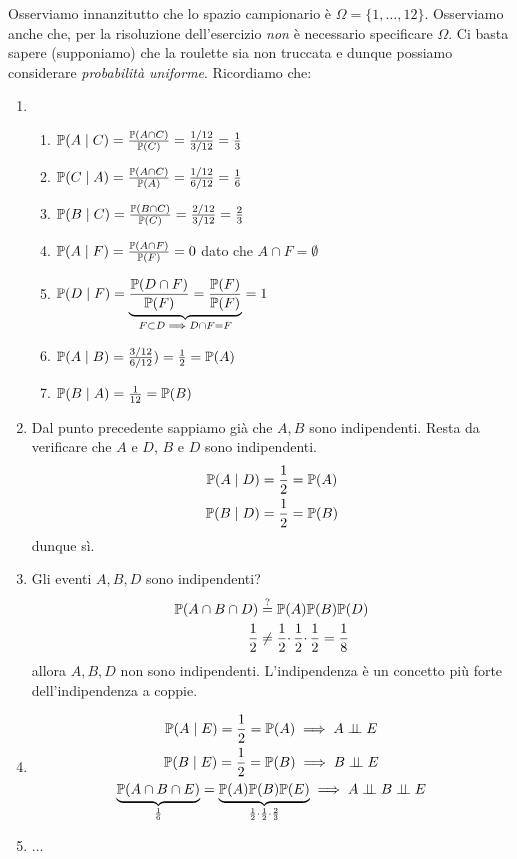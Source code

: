Osserviamo innanzitutto che lo spazio campionario è $\Omega =\{1,\dots,12\}$. Osserviamo anche che, per la risoluzione dell'esercizio \textit{non} è necessario specificare $\Omega $. Ci basta sapere (supponiamo) che la roulette sia non truccata e dunque possiamo considerare \textit{probabilità uniforme}. Ricordiamo che:
\begin{enumerate}
	\item 
	\begin{enumerate}
		\item $\mathbb{P}(A\mid C) =\frac{\mathbb{P}(A\cap C)}{\mathbb{P}(C)} =\frac{1/12}{3/12} =\frac{1}{3}$
		\item $\mathbb{P}(C\mid A) =\frac{\mathbb{P}(A\cap C)}{\mathbb{P}(A)} =\frac{1/12}{6/12} =\frac{1}{6}$
		\item $\mathbb{P}(B\mid C) =\frac{\mathbb{P}(B\cap C)}{\mathbb{P}(C)} =\frac{2/12}{3/12} =\frac{2}{3}$
		\item $\mathbb{P}(A\mid F) =\frac{\mathbb{P}(A\cap F)}{\mathbb{P}(F)} =0$ dato che $A\cap F=\emptyset $
		\item $\mathbb{P}(D\mid F) =\underbrace{\frac{\mathbb{P}(D\cap F)}{\mathbb{P}(F)} =\frac{\mathbb{P}(F)}{\mathbb{P}(F)}}_{F\subset D\implies D\cap F=F} =1$
		\item $\mathbb{P}(A\mid B) =\frac{3/12}{6/12}) =\frac{1}{2} =\mathbb{P}(A)$
		\item $\mathbb{P}(B\mid A) =\frac{1}{12} =\mathbb{P}(B)$
	\end{enumerate}
	\item Dal punto precedente sappiamo già che $A,B$ sono indipendenti. Resta da verificare che $A$ e $D$, $B$ e $D$ sono indipendenti.
	\begin{gather*}
		\mathbb{P}(A\mid D) =\frac{1}{2} =\mathbb{P}(A)\\
		\mathbb{P}(B\mid D) =\frac{1}{2} =\mathbb{P}(B)
	\end{gather*}
	dunque sì.
	\item Gli eventi $A,B,D$ sono indipendenti?
	\begin{align*}
		\mathbb{P}(A\cap B\cap D) & \overset{?}{=} \mathbb{P}(A)\mathbb{P}(B)\mathbb{P}(D)\\
		\frac{1}{2} & \neq \frac{1}{2} \cdotp \frac{1}{2} \cdotp \frac{1}{2} =\frac{1}{8}
	\end{align*}
	allora $A,B,D$ non sono indipendenti. L'indipendenza è un concetto più forte dell'indipendenza a coppie.
	\item
	\begin{gather*}
		\PP(A\mid E) =\frac{1}{2} =\PP(A) \implies A\Bot E\\
		\PP(B\mid E) =\frac{1}{2} =\PP(B) \implies B\Bot E\\
		\underbrace{\PP(A\cap B\cap E)}_{\frac{1}{6}} =\underbrace{\PP(A)\PP(B)\PP(E)}_{\frac{1}{2} \cdotp \frac{1}{2} \cdotp \frac{2}{3}} \implies A\Bot B\Bot E
	\end{gather*}
	\item $\dots$
\end{enumerate}

